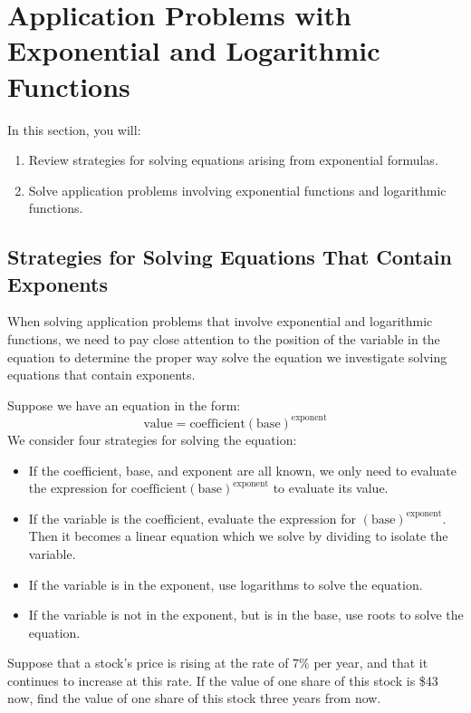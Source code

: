 \section{Application Problems with Exponential and Logarithmic Functions}

In this section, you will:
\begin{enumerate}
    \item Review strategies for solving equations arising from exponential formulas.
    \item Solve application problems involving exponential functions and logarithmic functions.
\end{enumerate}

\subsection{Strategies for Solving Equations That Contain Exponents}

When solving application problems that involve exponential and logarithmic functions, we need to pay close attention to the position of the variable in the equation to determine the proper way solve the equation we investigate solving equations that contain exponents.

Suppose we have an equation in the form: \[ \text{value} = \text{coefficient}(\text{base})^{\text{exponent}} \]
We consider four strategies for solving the equation:


\begin{itemize}
    \item If the coefficient, base, and exponent are all known, we only need to evaluate the expression for \(\text{coefficient}(\text{base})^{\text{exponent}}\) to evaluate its value.

    \item If the variable is the coefficient, evaluate the expression for \((\text{base})^{\text{exponent}}\). Then it becomes a linear equation which we solve by dividing to isolate the variable.

    \item If the variable is in the exponent, use logarithms to solve the equation.

    \item If the variable is not in the exponent, but is in the base, use roots to solve the equation.
\end{itemize}

\begin{example}
    Suppose that a stock's price is rising at the rate of 7\% per year, and that it continues to increase at this rate. If the value of one share of this stock is \$43 now, find the value of one share of this stock three years from now.
\end{example}

